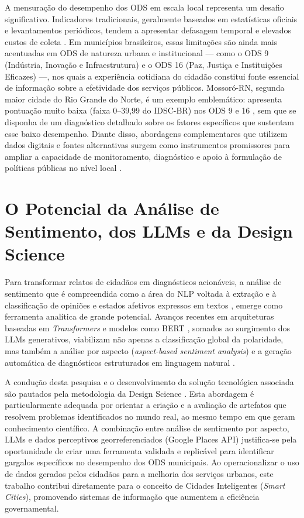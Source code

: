 A mensuração do desempenho dos ODS em escala local representa um desafio
significativo. Indicadores tradicionais, geralmente baseados em estatísticas
oficiais e levantamentos periódicos, tendem a apresentar defasagem temporal e elevados custos de coleta
\cite{abidoye2022}. Em municípios brasileiros, essas limitações são ainda
mais acentuadas em ODS de natureza urbana e institucional --- como o ODS 9
(Indústria, Inovação e Infraestrutura) e o ODS 16 (Paz, Justiça e
Instituições Eficazes) ---, nos quais a experiência cotidiana do cidadão
constitui fonte essencial de informação sobre a efetividade dos serviços
públicos. Mossoró-RN, segunda maior cidade do Rio Grande do Norte, é um
exemplo emblemático: apresenta pontuação muito baixa (faixa 0--39,99 do
\gls{IDSC}-BR) nos ODS 9 e 16 \cite{idsc2024}, sem que se disponha de um
diagnóstico detalhado sobre os fatores específicos que sustentam esse baixo
desempenho. Diante disso, abordagens complementares que utilizem dados
digitais e fontes alternativas surgem como instrumentos promissores para
ampliar a capacidade de monitoramento, diagnóstico e apoio à formulação de
políticas públicas no nível local \cite{larosa2025}.

\section{O Potencial da Análise de Sentimento, dos LLMs e da Design Science}
\label{sec:potencial-analise}

Para transformar relatos de cidadãos em diagnósticos
acionáveis, a análise de sentimento que é compreendida como a área do \gls{NLP}
voltada à extração e à classificação de opiniões e estados afetivos
expressos em textos \cite{wankhade2022,liu2023b}, emerge como ferramenta
analítica de grande potencial. Avanços recentes em arquiteturas baseadas em
\textit{Transformers} \cite{vaswani2017} e modelos como \gls{BERT}
\cite{devlin2019}, somados ao surgimento dos \gls{LLM}s generativos, viabilizam
não apenas a classificação global da polaridade, mas também a análise por
aspecto (\textit{aspect-based sentiment analysis}) e a geração automática de
diagnósticos estruturados em linguagem natural \cite{schimanski2024,gupta2024}.

A condução desta pesquisa e o desenvolvimento da solução tecnológica
associada são pautados pela metodologia da Design Science
\cite{wieringa2014,dresch2015}. Esta abordagem é particularmente adequada
por orientar a criação e a avaliação de artefatos que resolvem problemas
identificados no mundo real, ao mesmo tempo em que geram conhecimento
científico. A combinação entre análise de sentimento por aspecto, \gls{LLM}s
e dados perceptivos georreferenciados (Google Places API) justifica-se pela
oportunidade de criar uma ferramenta validada e replicável para identificar
gargalos específicos no desempenho dos ODS municipais. Ao operacionalizar o
uso de dados gerados pelos cidadãos para a melhoria dos serviços urbanos,
este trabalho contribui diretamente para o conceito de Cidades Inteligentes
(\textit{Smart Cities}), promovendo sistemas de informação que aumentem a
eficiência governamental.
